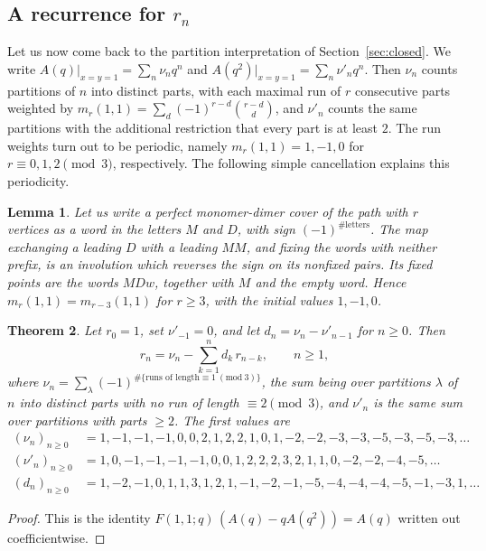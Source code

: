 \documentclass[11pt,reqno]{amsart}
\numberwithin{equation}{section}
\newtheorem{theorem}{Theorem}[section]
\newtheorem{lemma}[theorem]{Lemma}
\theoremstyle{remark}
\begin{document}
\subsection{A recurrence for \texorpdfstring{$r_n$}{rn}}
Let us now come back to the partition interpretation of Section~\ref{sec:closed}. We write
$A(q)|_{x=y=1}=\sum_n\nu_nq^n$ and $A(q^2)|_{x=y=1}=\sum_n\nu'_nq^n$. Then $\nu_n$ counts
partitions of $n$ into distinct parts, with each maximal run of $r$ consecutive parts
weighted by $m_r(1,1)=\sum_d(-1)^{r-d}\binom{r-d}d$, and $\nu'_n$ counts the same
partitions with the additional restriction that every part is at least $2$. The run
weights turn out to be periodic, namely $m_r(1,1)=1,-1,0$ for $r\equiv0,1,2\pmod3$,
respectively. The following simple cancellation explains this periodicity.

\begin{lemma}\label{lem:invol}
Let us write a perfect monomer-dimer cover of the path with $r$ vertices as a word in the
letters $M$ and $D$, with sign $(-1)^{\#\text{letters}}$. The map exchanging a leading
$D$ with a leading $MM$, and fixing the words with neither prefix, is an involution which
reverses the sign on its nonfixed pairs. Its fixed points are the words $MDw$, together
with $M$ and the empty word. Hence $m_r(1,1)=m_{r-3}(1,1)$ for $r\ge3$, with the initial
values $1,-1,0$.
\end{lemma}

\begin{theorem}\label{thm:rrec}
Let $r_0=1$, set $\nu'_{-1}=0$, and let $d_n=\nu_n-\nu'_{n-1}$ for $n\ge0$. Then
\[
r_n=\nu_n-\sum_{k=1}^{n}d_k\,r_{n-k},\qquad n\ge1,
\]
where $\nu_n=\sum_\lambda(-1)^{\#\{\text{runs of length}\equiv1\ (\mathrm{mod}\ 3)\}}$,
the sum being over partitions $\lambda$ of $n$ into distinct parts with no run of length
$\equiv2\pmod3$, and $\nu'_n$ is the same sum over partitions with parts $\ge2$. The
first values are
\begin{align*}
(\nu_n)_{n\ge0}&=1,-1,-1,-1,0,0,2,1,2,2,1,0,1,-2,-2,-3,-3,-5,-3,-5,-3,\dots\\
(\nu'_n)_{n\ge0}&=1,0,-1,-1,-1,-1,0,0,1,2,2,2,3,2,1,1,0,-2,-2,-4,-5,\dots\\
(d_n)_{n\ge0}&=1,-2,-1,0,1,1,3,1,2,1,-1,-2,-1,-5,-4,-4,-4,-5,-1,-3,1,\dots
\end{align*}
\end{theorem}

\begin{proof}
This is the identity $F(1,1;q)\,(A(q)-qA(q^2))=A(q)$ written out coefficientwise.
\end{proof}
\end{document}

